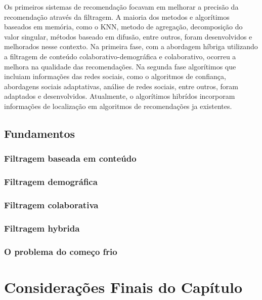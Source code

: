 Os primeiros sistemas de recomendação focavam em melhorar a precisão da recomendação através da filtragem. A maioria dos metodos e algorítimos baseados em memória, como o KNN, metodo de agregação, decomposição do valor singular, métodos baseado em difusão, entre outros, foram desenvolvidos e melhorados nesse contexto. Na primeira fase, com a abordagem híbriga utilizando a filtragem de conteúdo colaborativo-demográfica e colaborativo, ocorreu a melhora na qualidade das recomendações. Na segunda fase algorítimos que incluiam informações das redes sociais, como o algoritmos de confiança, abordagens sociais adaptativas, análise de redes sociais, entre outros, foram adaptados e desenvolvidos. Atualmente, o algorítimos hibrídos incorporam informações de localização em algoritmos de recomendações ja existentes. 

\subsection{Fundamentos}

\subsubsection{Filtragem baseada em conteúdo}

\subsubsection{Filtragem demográfica}

\subsubsection{Filtragem colaborativa}

\subsubsection{Filtragem hybrida}

\subsubsection{O problema do começo frio}


\section{Considerações Finais do Capítulo}





